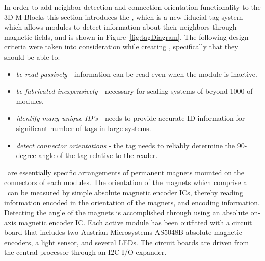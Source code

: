 In order to add neighbor detection and connection orientation functionality to the 3D M-Blocks this section introduces the \TagNamePlural, which is a new fiducial tag system which allows modules to detect information about their neighbors through magnetic fields, and is shown in Figure~\ref{fig:tagDiagram}. The following design criteria were taken into consideration while creating \TagNamePlural, specifically that they should be able to:
\begin{itemize}
	\item \emph{be read passively} - information can be read even when the module is inactive.
	\item \emph{be fabricated inexpensively} - necessary for scaling systems of beyond 1000 of modules.
	\item \emph{identify many unique ID's} - needs to provide accurate ID information for significant number of tags in large systems.
	\item \emph{detect connector orientations} - the tag needs to reliably determine the 90-degree angle of the tag relative to the reader.
\end{itemize} 

\TagNamePlural~are essentially specific arrangements of permanent magnets mounted on the connectors of each modules.  The orientation of the magnets which comprise a \tagName~can be measured by simple absolute magnetic encoder ICs, thereby reading information encoded in the orientation of the magnets, and encoding information. Detecting the angle of the magnets is accomplished through using an absolute on-axis magnetic encoder IC. Each active module has been outfitted with a circuit board that includes two Austrian Microsystems AS5048B absolute magnetic encoders, a light sensor, and several LEDs. The circuit boards are driven from the central processor through an I2C I/O expander.

